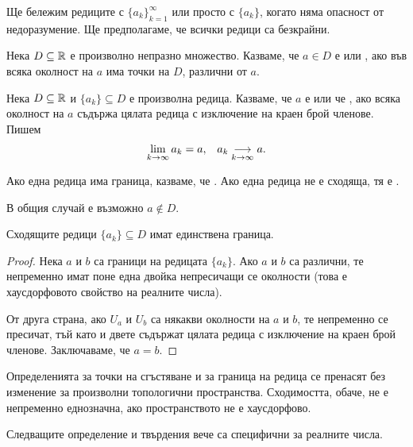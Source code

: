 \documentclass[numbers=endperiod, bibliography=totocnumbered]{scrartcl}
\begin{document}
Ще бележим редиците с \( {\{ a_k \}}_{k=1}^\infty \) или просто с \( \{ a_k \} \), когато няма опасност от недоразумение. Ще предполагаме, че всички редици са безкрайни.

\begin{definition}
  Нека \( D \subseteq \R \) е произволно непразно множество. Казваме, че \( a \in D \) е  или , ако във всяка околност на \( a \) има точки на \( D \), различни от \( a \).
\end{definition}

\begin{definition}
  Нека \( D \subseteq \R \) и \( \{ a_k \} \subseteq D \) е произволна редица. Казваме, че \( a \) е  или че , ако всяка околност на \( a \) съдържа цялата редица с изключение на краен брой членове. Пишем
  \begin{align*}
    \lim_{k \to \infty} a_k = a,
    &&
    a_k \Conv[k \to \infty]{} a.
  \end{align*}

  Ако една редица има граница, казваме, че . Ако една редица не е сходяща, тя е .
\end{definition}
\begin{note}
  В общия случай е възможно \( a \not\in D \).
\end{note}

\begin{proposition}
  Сходящите редици \( \{ a_k \} \subseteq D \) имат единствена граница.
\end{proposition}
\begin{proof}
  Нека \( a \) и \( b \) са граници на редицата \( \{ a_k \} \). Ако \( a \) и \( b \) са различни, те непременно имат поне една двойка непресичащи се околности (това е хаусдорфовото свойство на реалните числа).

  От друга страна, ако \( U_a \) и \( U_b \) са някакви околности на \( a \) и \( b \), те непременно се пресичат, тъй като и двете съдържат цялата редица с изключение на краен брой членове. Заключаваме, че \( a = b \).
\end{proof}

\begin{note}
  Определенията за точки на сгъстяване и за граница на редица се пренасят без изменение за произволни топологични пространства. Сходимостта, обаче, не е непременно еднозначна, ако пространството не е хаусдорфово.

  Следващите определение и твърдения вече са специфични за реалните числа.
\end{note}
\end{document}
